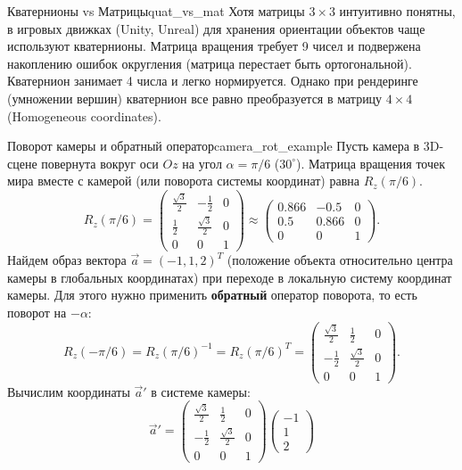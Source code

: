 \documentclass[12pt,a4paper]{article}
\begin{document}
  \begin{remarkIT}{Кватернионы vs Матрицы}{quat_vs_mat}
    Хотя матрицы $3 \times 3$ интуитивно понятны, в игровых движках
    (Unity, Unreal) для хранения ориентации объектов чаще используют
    кватернионы. Матрица вращения требует 9 чисел и подвержена
    накоплению ошибок округления (матрица перестает быть
    ортогональной). Кватернион занимает 4 числа и легко нормируется.
    Однако при рендеринге (умножении вершин) кватернион все равно
    преобразуется в матрицу $4 \times 4$ (Homogeneous coordinates).
  \end{remarkIT}

  \begin{definition}{Поворот камеры и обратный оператор}{camera_rot_example}
    Пусть камера в 3D-сцене повернута вокруг оси $Oz$ на угол $\alpha
    = \pi/6$ ($30^\circ$).
    Матрица вращения точек мира вместе с камерой (или поворота
    системы координат) равна $R_z(\pi/6)$.
    \[
      R_z(\pi/6) =
      \begin{pmatrix} \frac{\sqrt{3}}{2} & -\frac{1}{2} & 0
        \\ \frac{1}{2} & \frac{\sqrt{3}}{2} & 0 \\ 0 & 0 & 1
      \end{pmatrix} \approx
      \begin{pmatrix} 0.866 & -0.5 & 0 \\ 0.5 & 0.866 & 0 \\ 0 & 0 & 1
      \end{pmatrix}.
    \]
    Найдем образ вектора $\vec{a} = (-1, 1, 2)^T$ (положение объекта
    относительно центра камеры в глобальных координатах) при переходе
    в локальную систему координат камеры.
    Для этого нужно применить \textbf{обратный} оператор поворота, то
    есть поворот на $-\alpha$:
    \[
      R_z(-\pi/6) = R_z(\pi/6)^{-1} = R_z(\pi/6)^T =
      \begin{pmatrix} \frac{\sqrt{3}}{2} & \frac{1}{2} & 0
        \\ -\frac{1}{2} & \frac{\sqrt{3}}{2} & 0 \\ 0 & 0 & 1
      \end{pmatrix}.
    \]
    Вычислим координаты $\vec{a}'$ в системе камеры:
    \[
      \vec{a}' =
      \begin{pmatrix} \frac{\sqrt{3}}{2} & \frac{1}{2} & 0
        \\ -\frac{1}{2} & \frac{\sqrt{3}}{2} & 0 \\ 0 & 0 & 1
      \end{pmatrix}
      \begin{pmatrix} -1 \\ 1 \\ 2

\end{pmatrix}\]
\end{definition}
\end{document}
